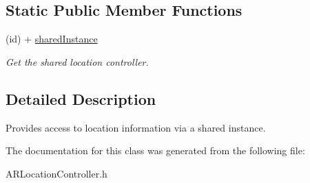 \subsection*{\-Static \-Public \-Member \-Functions}
\begin{DoxyCompactItemize}
\item 
\hypertarget{interface_a_r_location_controller_a7667cf3d4be0d3aa33942ace003f54ae}{
(id) + \hyperlink{interface_a_r_location_controller_a7667cf3d4be0d3aa33942ace003f54ae}{shared\-Instance}}
\label{interface_a_r_location_controller_a7667cf3d4be0d3aa33942ace003f54ae}

\begin{DoxyCompactList}\small\item\em \-Get the shared location controller. \end{DoxyCompactList}\end{DoxyCompactItemize}


\subsection{\-Detailed \-Description}
\-Provides access to location information via a shared instance. 

\-The documentation for this class was generated from the following file\-:\begin{DoxyCompactItemize}
\item 
\-A\-R\-Location\-Controller.\-h\end{DoxyCompactItemize}
